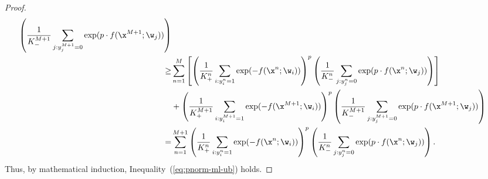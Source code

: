 \begin{proof}
\begin{equation*}
\begin{aligned}
   \left( \frac{1}{K_-^{M+1}} \sum_{j:y_j^{M+1}=0} \exp(p \cdot f(\x^{M+1}; \w_j)) \right) \\
\ge& 
   \sum_{n=1}^M \left[ \left( \frac{1}{K_+^n} \sum_{i:y_i^n=1} \exp(-f(\x^n; \w_i)) \right)^p 
   \left( \frac{1}{K_-^n} \sum_{j:y_j^n=0} \exp(p \cdot f(\x^n; \w_j)) \right) \right] \\
& +\left( \frac{1}{K_+^{M+1}} \sum_{i:y_i^{M+1}=1} \exp(-f(\x^{M+1}; \w_i)) \right)^p
   \left( \frac{1}{K_-^{M+1}} \sum_{j:y_j^{M+1}=0} \exp(p \cdot f(\x^{M+1}; \w_j)) \right) \\
=& \sum_{n=1}^{M+1} \left( \frac{1}{K_+^n} \sum_{i:y_i^n=1} \exp(-f(\x^n; \w_i)) \right)^p 
   \left( \frac{1}{K_-^n} \sum_{j:y_j^n=0} \exp(p \cdot f(\x^n; \w_j)) \right).
\end{aligned}
\end{equation*}
Thus, by mathematical induction, Inequality~(\ref{eq:pnorm-ml-ub}) holds.
\end{proof}
